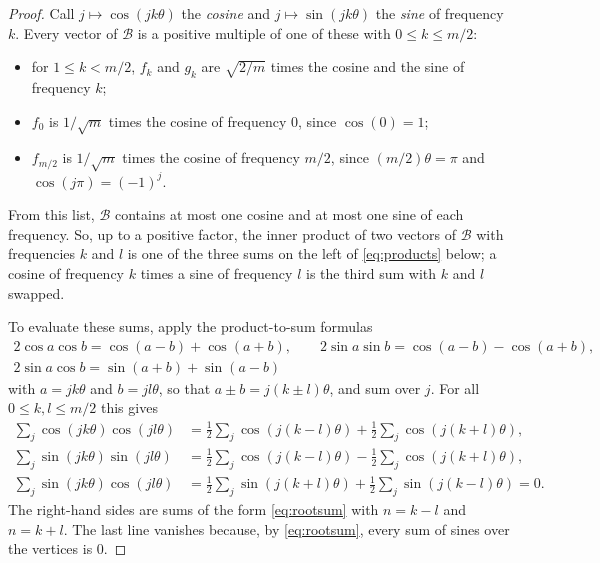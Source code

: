 \begin{proof}
  Call $j \mapsto \cos(jk\theta)$ the \emph{cosine} and
  $j \mapsto \sin(jk\theta)$ the \emph{sine} of frequency $k$. Every vector
  of $\mathcal{B}$ is a positive multiple of one of these with
  $0 \leq k \leq m/2$:
  \begin{itemize}
    \item for $1 \leq k < m/2$, $f_{k}$ and $g_{k}$ are $\sqrt{2/m}$ times
      the cosine and the sine of frequency $k$;
    \item $f_{0}$ is $1/\sqrt{m}$ times the cosine of frequency $0$, since
      $\cos(0) = 1$;
    \item $f_{m/2}$ is $1/\sqrt{m}$ times the cosine of frequency $m/2$,
      since $(m/2)\theta = \pi$ and $\cos(j\pi) = (-1)^{j}$.
  \end{itemize}
  From this list, $\mathcal{B}$ contains at most one cosine and at most one
  sine of each frequency. So, up to a positive factor, the inner product of
  two vectors of $\mathcal{B}$ with frequencies $k$ and $l$ is one of the
  three sums on the left of \eqref{eq:products} below; a cosine of
  frequency $k$ times a sine of frequency $l$ is the third sum with $k$ and
  $l$ swapped.

  To evaluate these sums, apply the product-to-sum formulas
  \[
    \begin{gathered}
      2\cos a\cos b = \cos(a-b) + \cos(a+b), \qquad
      2\sin a\sin b = \cos(a-b) - \cos(a+b), \\
      2\sin a\cos b = \sin(a+b) + \sin(a-b)
    \end{gathered}
  \]
  with $a = jk\theta$ and $b = jl\theta$, so that $a \pm b = j(k \pm l)\theta$,
  and sum over $j$. For all $0 \leq k, l \leq m/2$ this gives
  \begin{equation}
    \label{eq:products}
    \begin{aligned}
      \sum_{j} \cos(jk\theta)\cos(jl\theta)
        &= \tfrac12 \sum_{j} \cos(j(k-l)\theta)
          + \tfrac12 \sum_{j} \cos(j(k+l)\theta), \\
      \sum_{j} \sin(jk\theta)\sin(jl\theta)
        &= \tfrac12 \sum_{j} \cos(j(k-l)\theta)
          - \tfrac12 \sum_{j} \cos(j(k+l)\theta), \\
      \sum_{j} \sin(jk\theta)\cos(jl\theta)
        &= \tfrac12 \sum_{j} \sin(j(k+l)\theta)
          + \tfrac12 \sum_{j} \sin(j(k-l)\theta) = 0.
    \end{aligned}
  \end{equation}
  The right-hand sides are sums of the form \eqref{eq:rootsum} with
  $n = k - l$ and $n = k + l$. The last line vanishes because, by
  \eqref{eq:rootsum}, every sum of sines over the vertices is $0$.


\end{proof}
